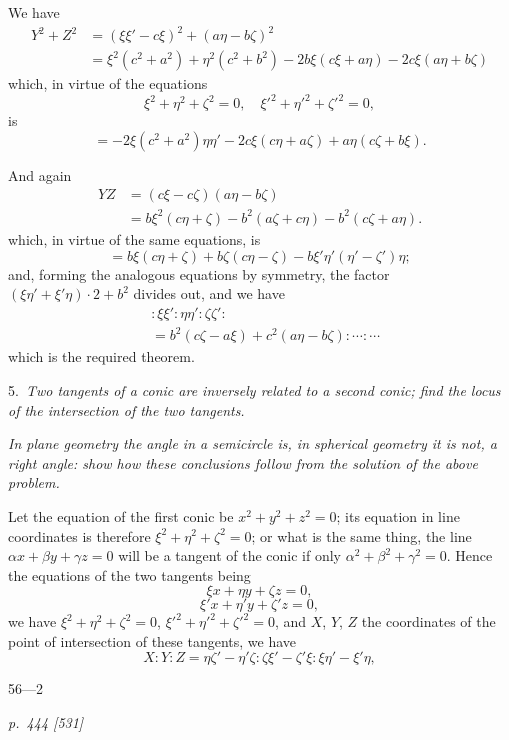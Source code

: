 \documentclass[11pt,a4paper]{book}
\begin{document}
We have
\begin{align*}
Y^2 + Z^2 &= (\xi\xi' - c\xi)^2 + (a\eta - b\zeta)^2 \\
          &= \xi^2(c^2 + a^2) + \eta^2(c^2 + b^2) - 2b\xi(c\xi + a\eta) - 2c\xi(a\eta + b\zeta)
\end{align*}
which, in virtue of the equations
\[
\xi^2 + \eta^2 + \zeta^2 = 0, \quad \xi'^2 + \eta'^2 + \zeta'^2 = 0,
\]
is
\[
= -2\xi(c^2 + a^2)\eta\eta' - 2c\xi(c\eta + a\zeta) + a\eta(c\zeta + b\xi).
\]

And again
\begin{align*}
YZ &= (c\xi - c\zeta)(a\eta - b\zeta) \\
   &= b\xi^2(c\eta + \zeta) - b^2(a\zeta + c\eta) - b^2(c\zeta + a\eta).
\end{align*}
which, in virtue of the same equations, is
\[
= b\xi(c\eta + \zeta) + b\zeta(c\eta - \zeta) - b\xi'\eta'(\eta' - \zeta')\eta;
\]
and, forming the analogous equations by symmetry, the factor $(\xi\eta' + \xi'\eta) \cdot 2 + b^2$ divides
out, and we have
\begin{align*}
&: \xi\xi' : \eta\eta' : \zeta\zeta' : \\
&= b^2(c\zeta - a\xi) + c^2(a\eta - b\zeta) : \cdots : \cdots
\end{align*}
which is the required theorem.

5.\ \textit{Two tangents of a conic are inversely related to a second conic; find the locus of the intersection of the two tangents.}

\textit{In plane geometry the angle in a semicircle is, in spherical geometry it is not, a right angle: show how these conclusions follow from the solution of the above problem.}

Let the equation of the first conic be $x^2 + y^2 + z^2 = 0$; its equation in line coordinates is therefore $\xi^2 + \eta^2 + \zeta^2 = 0$; or what is the same thing, the line $\alpha x + \beta y + \gamma z = 0$
will be a tangent of the conic if only $\alpha^2 + \beta^2 + \gamma^2 = 0$. Hence the equations of the two tangents being
\[
\xi x + \eta y + \zeta z = 0,
\]
\[
\xi' x + \eta' y + \zeta' z = 0,
\]
we have $\xi^2 + \eta^2 + \zeta^2 = 0$, $\xi'^2 + \eta'^2 + \zeta'^2 = 0$, and $X$, $Y$, $Z$ the coordinates of
the point of intersection of these tangents, we have
\[
X : Y : Z = \eta\zeta' - \eta'\zeta : \zeta\xi' - \zeta'\xi : \xi\eta' - \xi'\eta,
\]

\hfill 56---2

\clearpage

\bigskip
\textit{p.~444 [531]}
\smallskip
\end{document}
